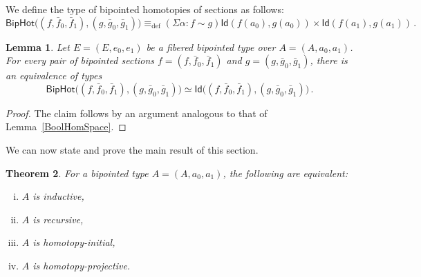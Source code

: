 \documentclass[reqno,10pt,a4paper,oneside]{amsart}
\numberwithin{equation}{section}
\theoremstyle{mythm}
\newtheorem{theorem}{Theorem}[subsection]
\newtheorem{lemma}[theorem]{Lemma}
\theoremstyle{mydef}
\theoremstyle{myrmk}
\newcommand{\deq}{\equiv}
\newcommand{\defeq}{\deq_{\mathrm{def}}}
\newcommand{\co}{\colon}
\newcommand{\Id}{\mathsf{Id}}
\begin{document}
We define the type of bipointed homotopies of sections as follows:
\[
\mathsf{BipHot} \big( (f, \bar{f}_0, \bar{f}_1), (g, \bar{g}_0, \bar{g}_1) \big) \defeq
(\Sigma \alpha \co f \sim g) \Id ( f(a_0), g(a_0) ) \times \Id ( f(a_1) , g(a_1) ) \, .
\]


\begin{lemma} Let $E = (E, e_0, e_1)$ be a fibered bipointed type over $A = (A, a_0, a_1)$. 
For every pair of bipointed sections $f = (f, \bar{f}_0, \bar{f}_1)$ and $g = (g, \bar{g}_0, \bar{g}_1)$, 
there is an equivalence of types
\[
\mathsf{BipHot} \big( (f, \bar{f}_0, \bar{f}_1), (g, \bar{g}_0, \bar{g}_1) \big)
\simeq 
\Id\big( (f, \bar{f}_0, \bar{f}_1), (g, \bar{g}_0, \bar{g}_1) \big) \, .
\]
\end{lemma}


\begin{proof} The claim follows by an argument analogous to that of Lemma~\ref{BoolHomSpace}.
\end{proof}



We can now state and prove the main result of this section. 


\begin{theorem}\label{lem:BoolMainInt} For a bipointed type $A = (A, a_0, a_1)$, the following are equivalent:
\begin{enumerate}[(i)]
\item $A$ is inductive, 
\item $A$ is recursive,
\item $A$ is homotopy-initial,
\item $A$ is homotopy-projective.
\end{enumerate}
\end{theorem}
\end{document}
